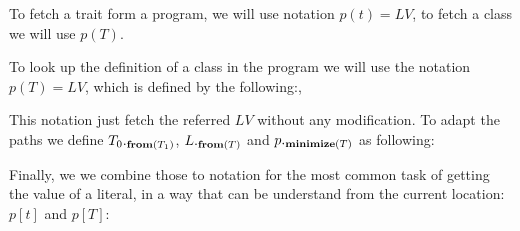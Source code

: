 
To fetch a trait form a program, we will use notation $p(t)=LV$, to 
fetch a class we will use $p(T)$.

\noindent To look up the definition of a class in the program we will use the notation
$p(T)=\textit{LV}$, which is defined by the following:,%
\begin{defye}%
%
%
%
%
%
\end{defye}


This notation just fetch the referred $LV$ without any modification.
To adapt the paths we define $T_0{._{\textbf{from}({T_1})}}$, $L{._{\textbf{from}({T})}}$ and $p{._{\textbf{minimize}({T})}}$ as following:
\begin{defye}%
\end{defye}

\noindent Finally, we we combine those to notation for the
most common task of getting the value of a literal, in a way that can be understand from the current location: $p[t]$ and $p[T]$:
\begin{defye}%
\end{defye}
\\${}_{}$\\

